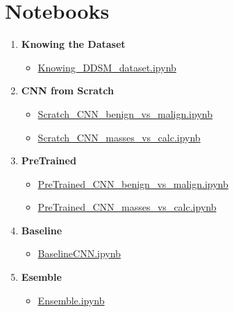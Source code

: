 \documentclass{book}
\begin{document}
        \section{Notebooks}
        \begin{enumerate}
            \item \textbf{Knowing the Dataset}
            \begin{itemize}
                \item \href{https://github.com/MarshaGomez/CNN-Medical-Imaging-Analysis/blob/main/Code/Knowing_DDSM_dataset.ipynb}{Knowing\_DDSM\_dataset.ipynb}
            \end{itemize}
            \item \textbf{CNN from Scratch}
            \begin{itemize}
                \item \href{https://github.com/MarshaGomez/CNN-Medical-Imaging-Analysis/blob/main/Code/Scratch_CNN_benign_vs_malign.ipynb}{Scratch\_CNN\_benign\_vs\_malign.ipynb}
                \item \href{https://github.com/MarshaGomez/CNN-Medical-Imaging-Analysis/blob/main/Code/ Scratch_CNN_masses_vs_calc.ipynb}{Scratch\_CNN\_masses\_vs\_calc.ipynb}
            \end{itemize}
            \item \textbf{PreTrained}
            \begin{itemize}
                \item \href{https://github.com/MarshaGomez/CNN-Medical-Imaging-Analysis/blob/main/Code/ PreTrained_CNN_benign_vs_malign.ipynb}{PreTrained\_CNN\_benign\_vs\_malign.ipynb}
                \item \href{https://github.com/MarshaGomez/CNN-Medical-Imaging-Analysis/blob/main/Code/ PreTrained_CNN_masses_vs_calc.ipynb}{PreTrained\_CNN\_masses\_vs\_calc.ipynb}
            \end{itemize}
            \item \textbf{Baseline}
            \begin{itemize} 
                \item \href{https://github.com/MarshaGomez/CNN-Medical-Imaging-Analysis/blob/main/Code/ BaselineCNN.ipynb}{BaselineCNN.ipynb}
            \end{itemize}
            \item \textbf{Esemble}
            \begin{itemize} 
                \item \href{https://github.com/MarshaGomez/CNN-Medical-Imaging-Analysis/blob/main/Code/Ensemble.ipynb}{Ensemble.ipynb}
            \end{itemize}
        \end{enumerate}
\end{document}
